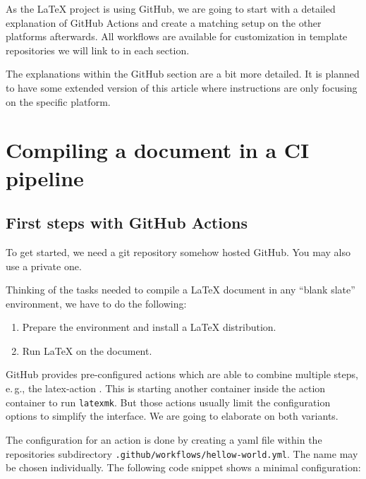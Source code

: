 \documentclass[final]{ltugboat}
\newcommand*{\command}[1]{\texttt{#1}}
\newcommand*{\file}[1]{\texttt{#1}}
\begin{document}
As the \LaTeX{} project is using GitHub, we are going to start with a detailed explanation of GitHub Actions and create a matching setup on the other platforms afterwards.
All workflows are available for customization in template repositories we will link to in each section.

The explanations within the GitHub section are a bit more detailed.
It is planned to have some extended version of this article where instructions are only focusing on the specific platform.

\section{Compiling a document in a CI pipeline}

\subsection{First steps with GitHub Actions}

To get started, we need a git repository somehow hosted GitHub.
You may also use a private one.

Thinking of the tasks needed to compile a LaTeX document in any “blank slate” environment, we have to do the following:

\begin{enumerate}
\item Prepare the environment and install a \LaTeX{} distribution.
\item Run \LaTeX{} on the document.
\end{enumerate}
%
\noindent GitHub provides pre-configured actions which are able to combine multiple steps, e.\,g., the latex-action \cite{latex-action}.
This  is starting another container inside the action container to run \command{latexmk}.
But those actions usually limit the configuration options to simplify the interface.
We are going to elaborate on both variants.

The configuration for an action is done by creating a yaml file within the repositories subdirectory \file{.github/workflows/hellow-world.yml}.
The name may be chosen individually.
The following code snippet shows a minimal configuration:

\inputminted{yaml}{examples/hello-world.yml}
\end{document}
